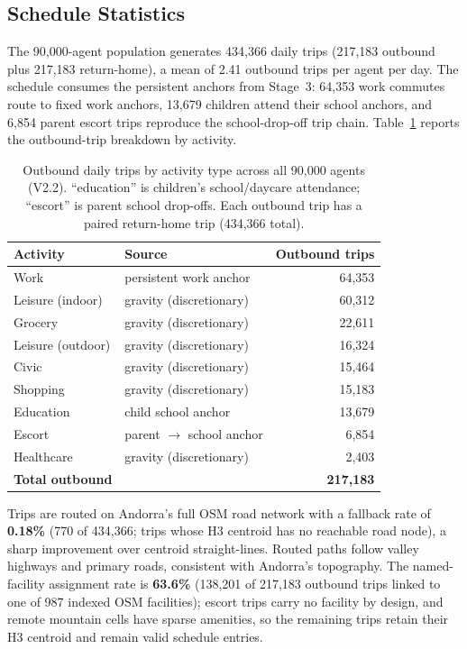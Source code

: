 \documentclass[a4paper,12pt]{article}
\begin{document}
\subsection{Schedule Statistics}
\label{subsec:schedule_results}

The 90,000-agent population generates 434{,}366 daily trips (217{,}183 outbound
plus 217{,}183 return-home), a mean of 2.41 outbound trips per agent per day. The
schedule consumes the persistent anchors from Stage~3: 64{,}353 work commutes route
to fixed work anchors, 13{,}679 children attend their school anchors, and 6{,}854
parent escort trips reproduce the school-drop-off trip chain. Table~\ref{tab:schedule_stats}
reports the outbound-trip breakdown by activity.

\begin{table}[H]
\caption{Outbound daily trips by activity type across all 90,000 agents (V2.2).
``education'' is children's school/daycare attendance; ``escort'' is parent
school drop-offs. Each outbound trip has a paired return-home trip
(434{,}366 total).}
\label{tab:schedule_stats}
\begin{tabularx}{\textwidth}{lXr}
\toprule
\textbf{Activity} & \textbf{Source} & \textbf{Outbound trips} \\
\midrule
Work             & persistent work anchor          & 64,353 \\
Leisure (indoor) & gravity (discretionary)         & 60,312 \\
Grocery          & gravity (discretionary)         & 22,611 \\
Leisure (outdoor)& gravity (discretionary)         & 16,324 \\
Civic            & gravity (discretionary)         & 15,464 \\
Shopping         & gravity (discretionary)         & 15,183 \\
Education        & child school anchor             & 13,679 \\
Escort           & parent $\rightarrow$ school anchor & 6,854 \\
Healthcare       & gravity (discretionary)         & 2,403 \\
\midrule
\textbf{Total outbound} & & \textbf{217,183} \\
\bottomrule
\end{tabularx}
\end{table}

Trips are routed on Andorra's full OSM road network with a fallback rate of
\textbf{0.18\%} (770 of 434{,}366; trips whose H3 centroid has no reachable road
node), a sharp improvement over centroid straight-lines. Routed paths follow valley
highways and primary roads, consistent with Andorra's topography. The named-facility
assignment rate is \textbf{63.6\%} (138{,}201 of 217{,}183 outbound trips linked to
one of 987 indexed OSM facilities); escort trips carry no facility by design, and
remote mountain cells have sparse amenities, so the remaining trips retain their H3
centroid and remain valid schedule entries.
\end{document}
